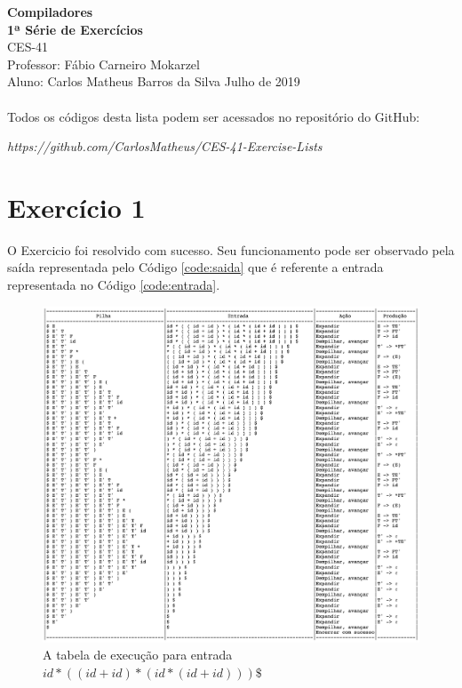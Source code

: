 \documentclass[a4paper, 10pt]{article}
\begin{document}
\noindent
\large
\textbf{Compiladores} \\
\textbf{1ª Série de Exercícios} \\
\normalsize CES-41  \\
Professor: Fábio Carneiro Mokarzel \\
Aluno: Carlos Matheus Barros da Silva \hfill Julho de 2019 \\ \\


Todos os códigos desta lista podem ser acessados no repositório do GitHub:

\textit{https://github.com/CarlosMatheus/CES-41-Exercise-Lists}

\section*{Exercício 1}

O Exercicio foi resolvido com sucesso. Seu funcionamento pode ser observado pela saída representada pelo Código \ref{code:saida} que é referente a entrada representada no Código \ref{code:entrada}.

\begin{figure}[H]
  \begin{center}
  \includegraphics[width=\linewidth]{./../output/output_question2_list_1.png}
  \caption{A tabela de execução para entrada $id * ((id + id) * (id * (id + id))) \$$}
  \label{fig:ouput2}
  \end{center}
\end{figure}
\end{document}
